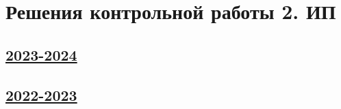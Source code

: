 \thispagestyle{empty}
\section{Решения контрольной работы 2. ИП}

\subsection[2023-2024]{\hyperref[sec:kr_02_ip_2023_2024]{2023-2024}}
\label{sec:sol_kr_02_ip_2023_2024}





\subsection[2022-2023]{\hyperref[sec:sol_kr_ip_02_2022_2023]{2022-2023}}
\label{sec:sol_kr_02_ip_2022_2023}

